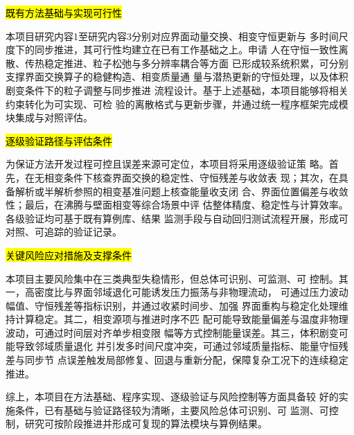 \hl{\zhhei 既有方法基础与实现可行性}

本项目研究内容1至研究内容3分别对应界面动量交换、相变守恒更新与
多时间尺度下的同步推进，其可行性均建立在已有工作基础之上。申请
人在守恒一致性离散、传热稳定推进、粒子松弛与多分辨率耦合等方面
已形成较系统积累，可分别支撑界面交换算子的稳健构造、相变质量通
量与潜热更新的守恒处理，以及体积剧变条件下的粒子调整与同步推进
流程设计。基于上述基础，本项目能够将相关约束转化为可实现、可检
验的离散格式与更新步骤，并通过统一程序框架完成模块集成与对照评估。

\hl{\zhhei 逐级验证路径与评估条件}

为保证方法开发过程可控且误差来源可定位，本项目将采用逐级验证策
略。首先，在无相变条件下核查界面交换的稳定性、守恒残差与收敛表
现；其次，在具备解析或半解析参照的相变基准问题上核查能量收支闭
合、界面位置偏差与收敛性；最后，在沸腾与壁面相变等综合场景中评
估整体精度、稳定性与计算效率。各级验证均可基于既有算例库、结果
监测手段与自动回归测试流程开展，形成可对照、可追踪的验证记录。

\hl{\zhhei 关键风险应对措施及支撑条件}

本项目主要风险集中在三类典型失稳情形，但总体可识别、可监测、可
控制。其一，高密度比与界面邻域退化可能诱发压力振荡与非物理流动，
可通过压力波动幅值、守恒残差等指标识别，并通过收紧时间步、加强
界面重构与稳定化处理维持计算稳定。其二，相变源项与推进时序不匹
配可能导致能量偏差与温度非物理波动，可通过时间层对齐单步相变限
幅等方式控制能量误差。其三，体积剧变可能导致邻域质量退化
并引发多时间尺度冲突，可通过邻域质量指标、能量守恒残差与同步节
点误差触发局部修复、回退与重新分配，保障复杂工况下的连续稳定推进。

综上，本项目在方法基础、程序实现、逐级验证与风险控制等方面具备较
好的实施条件，已有基础与验证路径较为清晰，主要风险总体可识别、可
监测、可控制，研究可按阶段推进并形成可复现的算法模块与算例结果。



	
	

